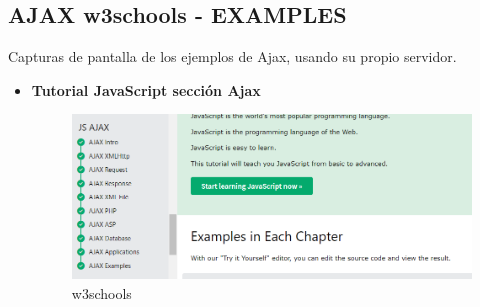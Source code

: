 \documentclass{article}
\begin{document}
    \subsection{AJAX w3schools - EXAMPLES}
    Capturas de pantalla de los ejemplos de Ajax, usando su propio servidor.
    \newpage
    \begin{itemize}
    	\item \textbf{Tutorial JavaScript sección Ajax}
    	\begin{figure}[H]
    		\centering
    		\includegraphics[width=1\textwidth,keepaspectratio]{img/w3schools.png}
    		\caption{w3schools}
    	\end{figure}
    \end{itemize}

\end{document}
